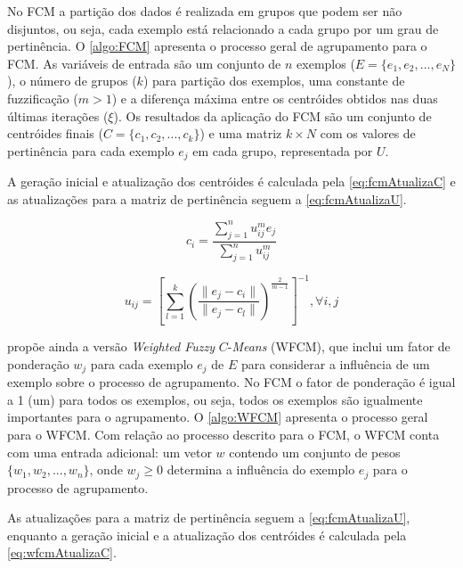 No FCM a partição dos dados é realizada em grupos que podem ser não disjuntos, ou seja, cada exemplo está relacionado a cada grupo por um grau de pertinência. O \autoref{algo:FCM} apresenta o processo geral de agrupamento para o FCM. As variáveis de entrada são um conjunto de $n$ exemplos ($E = \{e_{1}, e_{2}, ..., e_{N}\}$), o número de grupos ($k$) para partição dos exemplos, uma constante de fuzzificação ($m > 1$) e a diferença máxima entre os centróides obtidos nas duas últimas iterações ($\xi$). Os resultados da aplicação do FCM são um conjunto de centróides finais ($C = \{c_{1}, c_{2}, ..., c_{k}\}$) e uma matriz $k \times N$ com os valores de pertinência para cada exemplo $e_{j}$ em cada grupo, representada por $U$.



A geração inicial e atualização dos centróides é calculada pela \autoref{eq:fcmAtualizaC} e as atualizações para a matriz de pertinência seguem a \autoref{eq:fcmAtualizaU}.

\begin{equation}
c_{i} = \frac{\sum_{j=1}^{n} u_{ij}^{m}e_{j}}{\sum_{j=1}^{n} u_{ij}^{m}}
\label{eq:fcmAtualizaC}
\end{equation}

\begin{equation}
u_{ij} = \left[\sum_{l=1}^{k}\left(\frac{\|e_{j} - c_{i}\|}{\|e_{j} - c_{l}\|}\right)^{\frac{2}{m-1}}\right]^{-1}, \forall i, j
\label{eq:fcmAtualizaU}
\end{equation}

 propõe ainda a versão \emph{Weighted Fuzzy} $C$-\emph{Means} (WFCM), que inclui um fator de ponderação $w_{j}$ para cada exemplo $e_{j}$ de $E$ para considerar a influência de um exemplo sobre o processo de agrupamento. No FCM o fator de ponderação é igual a 1 (um) para todos os exemplos, ou seja, todos os exemplos são igualmente importantes para o agrupamento. O \autoref{algo:WFCM} apresenta o processo geral para o WFCM. Com relação ao processo descrito para o FCM, o WFCM conta com uma entrada adicional: um vetor $w$ contendo um conjunto de pesos $\{w_{1}, w_{2}, ..., w_{n}\}$, onde $w_{j} \geq 0$ determina a influência do exemplo $e_{j}$ para o processo de agrupamento.



As atualizações para a matriz de pertinência seguem a \autoref{eq:fcmAtualizaU}, enquanto a geração inicial e a atualização dos centróides é calculada pela \autoref{eq:wfcmAtualizaC}.


